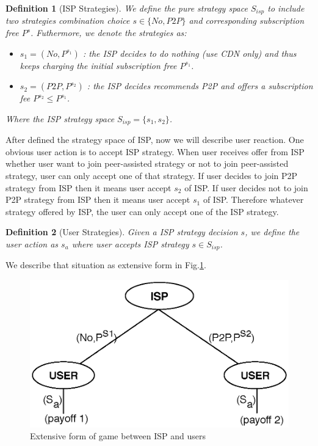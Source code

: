 \documentclass[paper]{ieice}
\begin{document}
\newtheorem{theorem}{Definition}
\begin{theorem}[ISP Strategies]
We define the pure strategy space $S_{isp}$ to include two strategies combination choice $s \in \{No, P2P\}$ and corresponding subscription free $P^{s}$.
Futhermore, we denote the strategies as:
\begin{itemize}
	\item $s_1 = (No, P^{s_1})$ : the ISP decides to do nothing (use CDN only) and thus keeps charging the initial subscription free $P^{s_1}$.
	\item $s_2 = (P2P, P^{s_2})$ : the ISP decides recommends P2P and offers a subscription fee $P^{s_2} \le P^{s_1}$.
\end{itemize}
Where the ISP strategy space $S_{isp} = \{s_1,s_2\}$.
\end{theorem}

After defined the strategy space of ISP, now we will describe user reaction.
One obvious user action is to accept ISP strategy.
When user receives offer from ISP whether user want to join peer-assisted strategy or not to join peer-assisted strategy, user can only accept one of that strategy.  
If user decides to join P2P strategy from ISP then it means user accept $s_2$ of ISP.
If user decides not to join P2P strategy from ISP then it means user accept $s_1$ of ISP.
Therefore whatever strategy offered by ISP, the user can only accept one of the ISP strategy.

\newtheorem{theorem2}{Definition}
\begin{theorem}[User Strategies]
Given a ISP strategy decision $s$, we define the user action as $s_a$ where user accepts ISP strategy $s \in S_{isp}$.
\end{theorem}
We describe that situation as extensive form in Fig.\ref{fig:gametree}.



\begin{figure}[tb] 
\begin{center}
\includegraphics[scale=0.35]{graphs/game-tree.eps}
\end{center}
\caption{Extensive form of game between ISP and users}
\label{fig:gametree}
\vspace{-2mm}
\end{figure}
\end{document}
